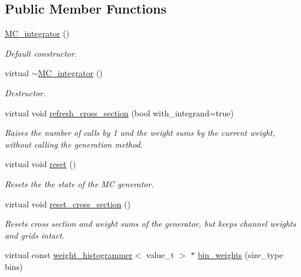 \subsection*{Public Member Functions}
\begin{DoxyCompactItemize}
\item 
\hypertarget{a00369_a3d233ae4f536ee8f73262b957977a953}{}\hyperlink{a00369_a3d233ae4f536ee8f73262b957977a953}{M\+C\+\_\+integrator} ()\label{a00369_a3d233ae4f536ee8f73262b957977a953}

\begin{DoxyCompactList}\small\item\em Default constructor. \end{DoxyCompactList}\item 
\hypertarget{a00369_ad648989c7e465dd7dc54499e5c7f088d}{}virtual \hyperlink{a00369_ad648989c7e465dd7dc54499e5c7f088d}{$\sim$\+M\+C\+\_\+integrator} ()\label{a00369_ad648989c7e465dd7dc54499e5c7f088d}

\begin{DoxyCompactList}\small\item\em Destructor. \end{DoxyCompactList}\item 
virtual void \hyperlink{a00369_ad6ac85dacfe0eb5a1ce951315a67fb56}{refresh\+\_\+cross\+\_\+section} (bool with\+\_\+integrand=true)
\begin{DoxyCompactList}\small\item\em Raises the number of calls by 1 and the weight sums by the current weight, without calling the generation method. \end{DoxyCompactList}\item 
virtual void \hyperlink{a00369_a691b9f4c2bb21bed65a7b4ab14115b77}{reset} ()
\begin{DoxyCompactList}\small\item\em Resets the the state of the M\+C generator. \end{DoxyCompactList}\item 
virtual void \hyperlink{a00369_ad15c5aae2298138f31688a4942b9bcb0}{reset\+\_\+cross\+\_\+section} ()
\begin{DoxyCompactList}\small\item\em Resets cross section and weight sums of the generator, but keeps channel weights and grids intact. \end{DoxyCompactList}\item 
\hypertarget{a00369_a398ba56eb0a99f3ea813fc0a50da67bc}{}virtual const \hyperlink{a00596}{weight\+\_\+histogrammer}$<$ value\+\_\+t $>$ $\ast$ \hyperlink{a00369_a398ba56eb0a99f3ea813fc0a50da67bc}{bin\+\_\+weights} (size\+\_\+type bins)\label{a00369_a398ba56eb0a99f3ea813fc0a50da67bc}


\end{DoxyCompactItemize}
